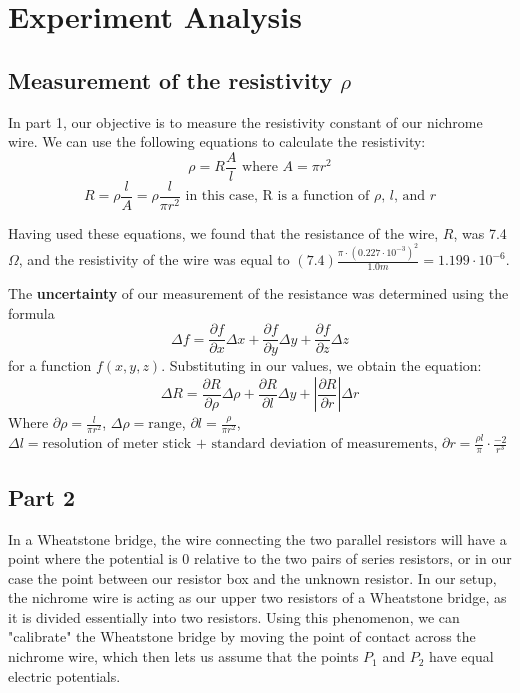 \documentclass[titlepage]{article}
\begin{document}
	\section{Experiment Analysis}
        
        \subsection{Measurement of the resistivity $\rho$} 




    In part 1, our objective is to measure the resistivity constant of our nichrome wire. We can use the following equations to calculate the resistivity:
    $$\rho = R \frac{A}{l} \text{ where } A=\pi r^2$$ 
    $$ R=\rho \frac{l}{A} = \rho \frac{l}{\pi r^2}  \text{ in this case, R is a function of $\rho$, $l$, and $r$} $$

    Having used these equations, we found that the resistance of the wire, $R$, was 7.4$\Omega$, and the resistivity of the wire was equal to $(7.4)\frac{\pi \cdot (0.227 \cdot 10^{-3})^2}{1.0m} = 1.199\cdot 10^{-6}$. 

    The \textbf{uncertainty} of our measurement of the resistance was determined using the formula $$\Delta f= \frac{\partial f}{\partial x} \Delta x + \frac{\partial f}{\partial y} \Delta y + \frac{\partial f}{\partial z} \Delta z$$ for a function $f(x,y,z)$.
    Substituting in our values, we obtain the equation:
    $$\Delta R= \frac{\partial R}{\partial \rho} \Delta \rho + \frac{\partial R}{\partial l} \Delta y + \left|\frac{\partial R}{\partial r}\right| \Delta r$$ 
    Where $\partial \rho = \frac{l}{\pi r^2}$, $\Delta \rho = \text{range}$, $\partial l = \frac{\rho}{\pi r^2}$, $\Delta l =\text{resolution of meter stick + standard deviation of measurements}$, $\partial r = \frac{\rho l}{\pi}\cdot \frac{-2}{r^3}$ 
    
    


        \subsection{Part 2} 
        In a Wheatstone bridge, the wire connecting the two parallel resistors will have a point where the potential is 0 relative to the two pairs of series resistors, or in our case the point between our resistor box and the unknown resistor. In our setup, the nichrome wire is acting as our upper two resistors of a Wheatstone bridge, as it is divided essentially into two resistors. Using this phenomenon, we can "calibrate" the Wheatstone bridge by moving the point of contact across the nichrome wire, which then lets us assume that the points $P_1$ and $P_2$ have equal electric potentials. 
\end{document}
